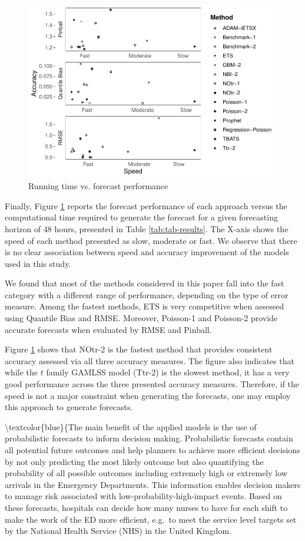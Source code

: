 \documentclass[]{elsarticle} %
\begin{document}
\begin{figure}[H]

{\centering \includegraphics[width=0.7\linewidth]{paper_files/figure-latex/time-accuracy-1} 

}

\caption{Running time vs. forecast performance}\label{fig:time-accuracy}
\end{figure}

Finally, Figure \ref{fig:time-accuracy} reports the forecast
performance of each approach versus the computational time required to
generate the forecast for a given forecasting horizon of 48 hours,
presented in Table \ref{tab:tab-results}. The X-axis shows the speed of
each method presented as slow, moderate or fast. We observe that there
is no clear association between speed and accuracy improvement of the
models used in this study.

We found that most of the methods considered in this paper fall into the
fast category with a different range of performance, depending on the
type of error measure. Among the fastest methods, ETS is very
competitive when assessed using Quantile Bias and RMSE. Moreover,
Poisson-1 and Poisson-2 provide accurate forecasts when evaluated by
RMSE and Pinball.

Figure \ref{fig:time-accuracy} shows that NOtr-2 is the fastest method
that provides consistent accuracy assessed via all three accuracy
measures. The figure also indicates that while the \(t\) family GAMLSS
model (Ttr-2) is the slowest method, it has a very good performance
across the three presented accuracy measures. Therefore, if the speed is
not a major constraint when generating the forecasts, one may employ
this approach to generate forecasts.

\textbackslash textcolor\{blue\}\{The main benefit of the applied models is the use of probabilistic forecasts to inform decision
making. Probabilistic forecasts contain all potential future outcomes and help planners to
achieve more efficient decisions by not only predicting the most likely outcome but also
quantifying the probability of all possible outcomes including extremely high or extremely
low arrivals in the Emergency Departments. This information enables decision makers to
manage risk associated with low-probability-high-impact events. Based on these forecasts,
hospitals can decide how many nurses to have for each shift to make the work of the ED more
efficient, e.g.~to meet the service level targets set by the National Health Service (NHS) in
the United Kingdom.
\end{document}
